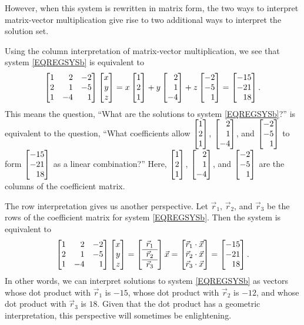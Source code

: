 However, when this system is rewritten in matrix form, the two ways to interpret matrix-vector
multiplication give rise to two additional ways to interpret the solution set.


Using the column interpretation of matrix-vector multiplication, we see that system \eqref{EQREGSYSb} is equivalent to
\[
	\mat{1&2&-2\\2&1&-5\\1&-4&1}\mat{x\\y\\z}=
	     x\mat{1\\2\\1}+y\mat{2\\1\\-4}+z\mat{-2\\-5\\1}
	     =\mat{-15\\-21\\18}.
\]
This means the question, ``What are the solutions to system \eqref{EQREGSYSb}?'' is equivalent to the question, ``What coefficients
allow $\mat{1\\2\\1}$, $\mat{2\\1\\-4}$, and $\mat{-2\\-5\\1}$ to form $\mat{-15\\-21\\18}$ as a linear combination?'' Here,
 $\mat{1\\2\\1}$, $\mat{2\\1\\-4}$, and $\mat{-2\\-5\\1}$ are the columns of the coefficient matrix.


The row interpretation gives us another perspective. Let $\vec r_1$, $\vec r_2$, and $\vec r_3$ be the rows of the coefficient matrix
for system \eqref{EQREGSYSb}. Then the system is equivalent to
\[
	\mat{1&2&-2\\2&1&-5\\1&-4&1}\mat{x\\y\\z}=
	\left[\begin{array}{c}\vec r_1\\\hline\vec r_2\\\hline\vec r_3\end{array}\right]\vec x=
	\mat{\vec r_1\cdot \vec x\\\vec r_2\cdot\vec x\\\vec r_3\cdot \vec x}
	     =\mat{-15\\-21\\18}.
\]
In other words, we can interpret solutions to system \eqref{EQREGSYSb} as vectors whose dot product
with $\vec r_1$ is $-15$, whose dot product with $\vec r_2$ is $-12$, and whose dot product with
$\vec r_3$ is $18$. Given that the dot product has a geometric interpretation, this perspective will
sometimes be enlightening.

